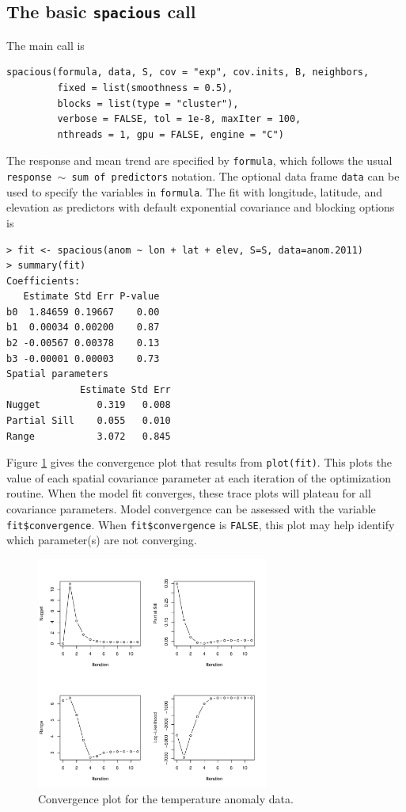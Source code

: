\documentclass[11pt]{article}
\begin{document}
\subsection{The basic {\tt spacious} call}

The main call is

\begin{verbatim}
spacious(formula, data, S, cov = "exp", cov.inits, B, neighbors,
         fixed = list(smoothness = 0.5),
         blocks = list(type = "cluster"),
         verbose = FALSE, tol = 1e-8, maxIter = 100,
         nthreads = 1, gpu = FALSE, engine = "C")
\end{verbatim}

The response and mean trend are specified by {\tt formula}, which follows the usual {\tt response $\sim$ sum of predictors} notation.
The optional data frame {\tt data} can be used to specify the variables in {\tt formula}.
The fit with longitude, latitude, and elevation as predictors with default exponential covariance and blocking options is

\begin{verbatim}
> fit <- spacious(anom ~ lon + lat + elev, S=S, data=anom.2011)
> summary(fit)
Coefficients:
   Estimate Std Err P-value
b0  1.84659 0.19667    0.00
b1  0.00034 0.00200    0.87
b2 -0.00567 0.00378    0.13
b3 -0.00001 0.00003    0.73
Spatial parameters
             Estimate Std Err
Nugget          0.319   0.008
Partial Sill    0.055   0.010
Range           3.072   0.845
\end{verbatim}

Figure \ref{f:converge} gives the convergence plot that results from {\tt plot(fit)}.
This plots the value of each spatial covariance parameter at each iteration of the optimization routine.
When the model fit converges, these trace plots will plateau for all covariance parameters.
Model convergence can be assessed with the variable {\tt fit\$convergence}.
When {\tt fit\$convergence} is {\tt FALSE}, this plot may help identify which parameter(s) are not converging.

\begin{figure}
	\caption{Convergence plot for the temperature anomaly data.}\label{f:converge}
	\centering
	\includegraphics[width=3in]{figures/converge.pdf}
\end{figure}
\end{document}
